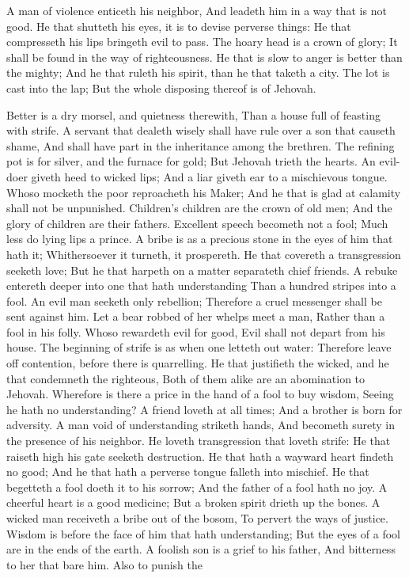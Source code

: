 A man of violence enticeth his neighbor, And leadeth him in a way that is not good.  He that shutteth his eyes, it is to devise perverse things: He that compresseth his lips bringeth evil to pass.  The hoary head is a crown of glory; It shall be found in the way of righteousness.  He that is slow to anger is better than the mighty; And he that ruleth his spirit, than he that taketh a city.  The lot is cast into the lap; But the whole disposing thereof is of Jehovah. 

Better is a dry morsel, and quietness therewith, Than a house full of feasting with strife.  A servant that dealeth wisely shall have rule over a son that causeth shame, And shall have part in the inheritance among the brethren.  The refining pot is for silver, and the furnace for gold; But Jehovah trieth the hearts.  An evil-doer giveth heed to wicked lips; And a liar giveth ear to a mischievous tongue.  Whoso mocketh the poor reproacheth his Maker; And he that is glad at calamity shall not be unpunished.  Children’s children are the crown of old men; And the glory of children are their fathers.  Excellent speech becometh not a fool; Much less do lying lips a prince.  A bribe is as a precious stone in the eyes of him that hath it; Whithersoever it turneth, it prospereth.  He that covereth a transgression seeketh love; But he that harpeth on a matter separateth chief friends.  A rebuke entereth deeper into one that hath understanding Than a hundred stripes into a fool.  An evil man seeketh only rebellion; Therefore a cruel messenger shall be sent against him.  Let a bear robbed of her whelps meet a man, Rather than a fool in his folly.  Whoso rewardeth evil for good, Evil shall not depart from his house.  The beginning of strife is as when one letteth out water: Therefore leave off contention, before there is quarrelling.  He that justifieth the wicked, and he that condemneth the righteous, Both of them alike are an abomination to Jehovah.  Wherefore is there a price in the hand of a fool to buy wisdom, Seeing he hath no understanding?  A friend loveth at all times; And a brother is born for adversity.  A man void of understanding striketh hands, And becometh surety in the presence of his neighbor.  He loveth transgression that loveth strife: He that raiseth high his gate seeketh destruction.  He that hath a wayward heart findeth no good; And he that hath a perverse tongue falleth into mischief.  He that begetteth a fool doeth it to his sorrow; And the father of a fool hath no joy.  A cheerful heart is a good medicine; But a broken spirit drieth up the bones.  A wicked man receiveth a bribe out of the bosom, To pervert the ways of justice.  Wisdom is before the face of him that hath understanding; But the eyes of a fool are in the ends of the earth.  A foolish son is a grief to his father, And bitterness to her that bare him.  Also to punish the 